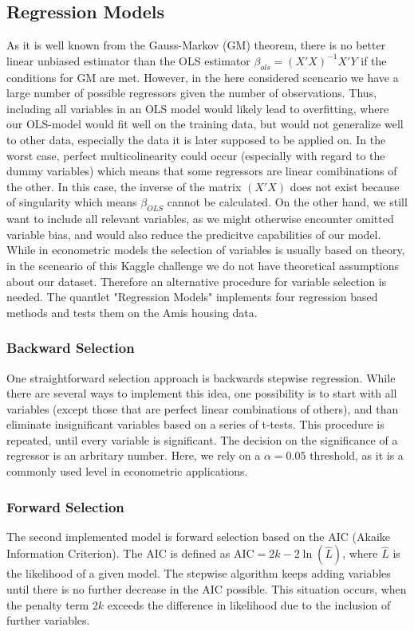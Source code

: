 \subsection{Regression Models}
As it is well known from the Gauss-Markov (GM) theorem, there is no better linear unbiased estimator than the OLS estimator $\beta_{ols} = (X'X)^{-1}X'Y$  if the conditions for GM are met. However, in the here considered scencario we have a large number of possible regressors given the number of observations. Thus, including all variables in an OLS model would likely lead to overfitting, where our OLS-model would fit well on the training data, but would not generalize well to other data, especially the data it is later supposed to be applied on. In the worst case, perfect multicolinearity could occur (especially with regard to the dummy variables)  which means that some regressors are linear comibinations of the other. In this case, the inverse of the matrix $(X'X)$ does not exist  because of singularity which means $\beta_{OLS}$ cannot be calculated.  
On the other hand, we still want to include all relevant variables, as we might otherwise encounter omitted variable bias, and would also reduce the predicitve capabilities of our model. 
While in econometric models  the selection of variables is usually based on theory, in the sceneario of this Kaggle challenge we do not have theoretical assumptions about our dataset. Therefore an alternative procedure for variable selection is needed. The quantlet "Regression Models"  implements four regression based methods and tests them on the Amis housing data. 

\subsubsection{Backward Selection}
One straightforward selection approach is backwards stepwise regression. While there are several ways to implement this idea, one possibility is to  start with all variables (except those that are perfect linear combinations of others), and than eliminate insignificant variables based on a series of  t-tests. This procedure is repeated, until every variable is significant. The decision on the significance of a regressor is an arbritary number. Here, we rely on a $\alpha = 0.05$ threshold, as it is a commonly used level in econometric applications. 

\subsubsection{Forward Selection}
The second implemented model is forward selection based on the AIC (Akaike Information Criterion). The AIC is defined as 
${\displaystyle \mathrm{AIC}=2k-2\ln({\hat{L}})}$, where $\hat{L}$ is the likelihood of a given model. The stepwise algorithm keeps adding variables until there is no further decrease in the AIC possible. This situation occurs, when the penalty term $2k$ exceeds the difference in likelihood due to the inclusion of further variables. 

